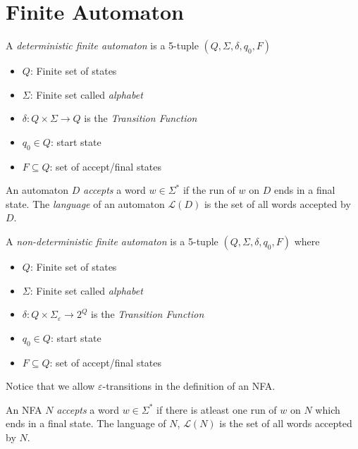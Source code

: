\section{Finite Automaton}

\begin{definition}[DFA]
    A \textit{deterministic finite automaton} is a 5-tuple $(Q, \Sigma, \delta, q_0, F)$ 
    \begin{itemize}
        \item $Q$: Finite set of states 
        \item $\Sigma$: Finite set called \textit{alphabet}
        \item $\delta: Q\times\Sigma\to Q$ is the \textit{Transition Function}
        \item $q_0\in Q$: start state 
        \item $F\subseteq Q$: set of accept/final states
    \end{itemize}
\end{definition}

\begin{definition}
    An automaton $D$ \textit{accepts} a word $w\in\Sigma^*$ if the run of $w$ on $D$ ends in a final state. The \textit{language} of an automaton $\mathcal{L}(D)$ is the set of all words accepted by $D$.
\end{definition}

\begin{definition}[NFA]
    A \textit{non-deterministic finite automaton} is a 5-tuple $(Q,\Sigma,\delta,q_0,F)$ where 
    \begin{itemize}
        \item $Q$: Finite set of states 
        \item $\Sigma$: Finite set called \textit{alphabet}
        \item $\delta: Q\times\Sigma_\varepsilon\to2^Q$ is the \textit{Transition Function}
        \item $q_0\in Q$: start state 
        \item $F\subseteq Q$: set of accept/final states
    \end{itemize}
\end{definition}

Notice that we allow $\varepsilon$-transitions in the definition of an NFA. 

\begin{definition}
    An NFA $N$ \textit{accepts} a word $w\in\Sigma^*$ if there is atleast one run of $w$ on $N$ which ends in a final state. The language of $N$, $\mathcal{L}(N)$ is the set of all words accepted by $N$.
\end{definition}

